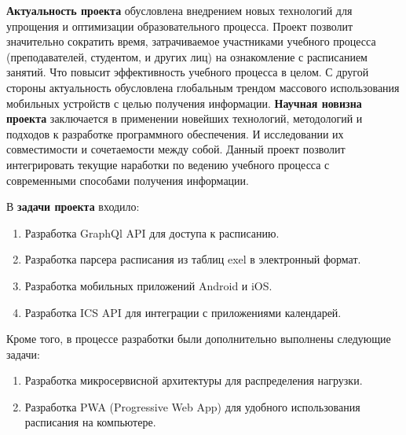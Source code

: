 \textbf{Актуальность проекта} обусловлена внедрением новых технологий для упрощения и оптимизации образовательного процесса. 
Проект позволит значительно сократить время, затрачиваемое участниками учебного процесса (преподавателей, студентом, и других лиц) 
на ознакомление с расписанием занятий. Что повысит эффективность учебного процесса в целом. 
С другой стороны актуальность обусловлена глобальным трендом массового использования мобильных устройств с целью получения информации.
\textbf{Научная новизна проекта} заключается в применении новейших технологий, 
методологий и подходов к разработке программного обеспечения. 
И исследовании их совместимости и сочетаемости между собой. 
Данный проект позволит интегрировать текущие наработки по ведению учебного процесса 
с современными способами получения информации.

В \textbf{задачи проекта} входило:
\begin{enumerate}
    \item Разработка GraphQl API для доступа к расписанию.
    \item Разработка парсера расписания из таблиц exel в электронный формат.
    \item Разработка мобильных приложений Android и iOS.
    \item Разработка ICS API для интеграции с приложениями календарей.
\end{enumerate}
Кроме того, в процессе разработки были дополнительно выполнены следующие задачи:
\begin{enumerate}
    \item Разработка микросервисной архитектуры для распределения нагрузки.
    \item Разработка PWA (Progressive Web App) для удобного использования расписания на компьютере.
\end{enumerate}
